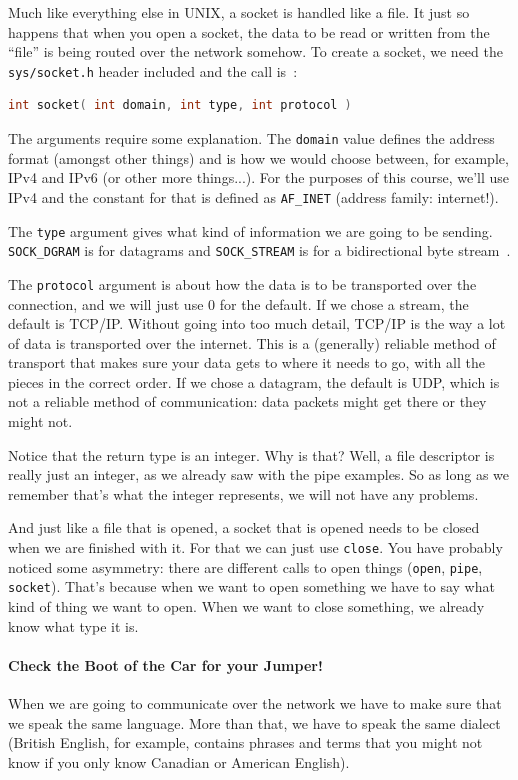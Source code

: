 \documentclass[a4paper]{report}
\begin{document}
Much like everything else in UNIX, a socket is handled like a file. It just so happens that when you open a socket, the data to be read or written from the ``file'' is being routed over the network somehow. To create a socket, we need the \texttt{sys/socket.h} header included and the call is~\cite{apunix}:

\begin{lstlisting}[language=C]
int socket( int domain, int type, int protocol )
\end{lstlisting}

The arguments require some explanation. The \texttt{domain} value defines the address format (amongst other things) and is how we would choose between, for example, IPv4 and IPv6 (or other more things...). For the purposes of this course, we'll use IPv4 and the constant for that is defined as \texttt{AF\_INET} (address family: internet!).

The \texttt{type} argument gives what kind of information we are going to be sending. \texttt{SOCK\_DGRAM} is for datagrams and \texttt{SOCK\_STREAM} is for a bidirectional byte stream~\cite{apunix}.

The \texttt{protocol} argument is about how the data is to be transported over the connection, and we will just use 0 for the default. If we chose a stream, the default is TCP/IP. Without going into too much detail, TCP/IP is the way a lot of data is transported over the internet. This is a (generally) reliable method of transport that makes sure your data gets to where it needs to go, with all the pieces in the correct order. If we chose a datagram, the default is UDP, which is not a reliable method of communication: data packets might get there or they might not.

Notice that the return type is an integer. Why is that? Well, a file descriptor is really just an integer, as we already saw with the pipe examples. So as long as we remember that's what the integer represents, we will not have any problems.

And just like a file that is opened, a socket that is opened needs to be closed when we are finished with it. For that we can just use \texttt{close}. You have probably noticed some asymmetry: there are different calls to open things (\texttt{open}, \texttt{pipe}, \texttt{socket}). That's because when we want to open something we have to say what kind of thing we want to open. When we want to close something, we already know what type it is.

\paragraph{Check the Boot of the Car for your Jumper!}
When we are going to communicate over the network we have to make sure that we speak the same language. More than that, we have to speak the same dialect (British English, for example, contains phrases and terms that you might not know if you only know Canadian or American English).
\end{document}

